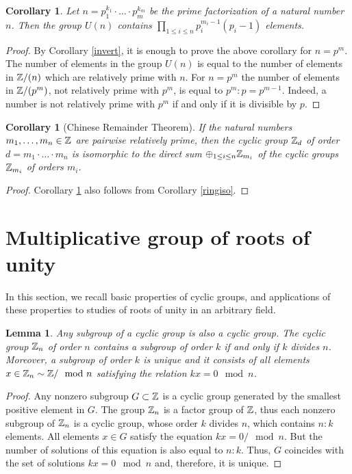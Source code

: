 \documentclass[11pt]{article}
\theoremstyle{plain}
\newtheorem{lemma}[theorem]{Lemma}
\newtheorem{corollary}[theorem]{Corollary}
\theoremstyle{definition}
\begin{document}
\begin{corollary} Let $n=p_1^{k_1}\cdot\ldots\cdot p_m^{k_m}$ be the prime factorization of a natural number $n$. Then the group $U(n)$ contains $\prod_{1 \leq i \leq n} p_i^{m_i-1} (p_i-1)$ elements.
\end{corollary}

\begin{proof} By Corollary \ref{invert}, it is enough to prove the above corollary for $n=p^m$. The number of elements in the group $U(n)$ is equal to the number of elements in $\Bbb Z/ (n)$ which are relatively prime with $n$. For $n=p^m$ the number of elements in $\Bbb Z/ (p^m)$, not relatively prime  with $p^m$,  is equal to $p^m:p=p^{m-1}$. Indeed, a number is not relatively prime with $p^m$ if and only if it is divisible by $p$.
\end{proof}

\begin{corollary}[Chinese  Remainder  Theorem] \label{china} If the natural numbers $m_1,\dots,m_n\in \Bbb Z$ are pairwise relatively prime, then the cyclic group $\Bbb Z_d $ of  order  $d=m_1\cdot \ldots \cdot m_n$ is isomorphic  to the direct sum $\oplus_{1\leq i\leq n} \Bbb Z_{ m_i}$ of the cyclic groups $\Bbb Z_ {m_i}$ of orders $m_i$.
\end{corollary}

\begin{proof} Corollary \ref {china} also follows from Corollary \ref{ringiso}.
\end{proof}

\section{Multiplicative group of  roots of unity}\label{secthre}

In this section, we recall basic  properties of cyclic groups, and applications of these properties to studies of roots of unity in an arbitrary field.

\begin{lemma}\label{cyclic1} Any subgroup of a cyclic group is also a cyclic group. The cyclic group $\Bbb Z_n$ of order $n$ contains a subgroup of order $k$ if and only if $k$ divides $n$. Moreover, a subgroup of order $k$ is unique and it consists of all elements $x\in \Bbb Z_n\sim \Bbb Z/\mod n$  satisfying the relation $k x=0 \mod n$.
\end{lemma}

\begin{proof} Any nonzero subgroup $G\subset \Bbb  Z$ is a cyclic group generated by the smallest positive element in $G$. The group $\Bbb Z_n$ is a factor group of $\Bbb Z$, thus each nonzero subgroup of $\Bbb Z_n$ is a cyclic group, whose order $k$ divides $n$, which contains $n:k$ elements. All elements $x\in G$   satisfy the equation $k x=0/ \mod n$. But the number of solutions of this equation is also equal to $n:k$. Thus, $G$ coincides with the set of solutions $kx=0\mod n$ and, therefore, it is unique.
\end{proof}
\end{document}
